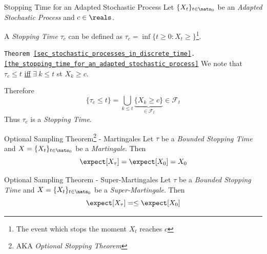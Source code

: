 \documentclass[11pt,a4paper]{article}
\begin{document}
    \begin{theorem}{Stopping Time for an Adapted Stochastic Process}\label{the_stopping_time_for_an_adapted_stochastic_process}
      Let $\{X_t\}_{t\in\nats_0}$ be an \textit{Adapted Stochastic Process} and $c\in\reals$.
      \par A \textit{Stopping Time} $\tau_c$ can be defined as $\tau_c=\inf\{t\geq0:X_t\geq \}$\footnote{The event which stops the moment $X_t$ reaches $c$}.
    \end{theorem}

    \begin{proposition}{\texttt{Theorem \ref{sec_stochastic_processes_in_discrete_time}.\ref{the_stopping_time_for_an_adapted_stochastic_process}}}
      We note that $\tau_c\leq t$ \underline{iff} $\exists\ k\leq t$ st $X_k\geq c$.
      \par Therefore
      \[ \{\tau_c\leq t\}=\bigcup\limits_{k\leq t}\underbrace{\{X_k\geq c\}}_{\in\mathcal{F}_t}\in\mathcal{F}_t \]
      Thus $\tau_c$ is a \textit{Stopping Time}.
    \end{proposition}

    \begin{theorem}{Optional Sampling Theorem\footnote{AKA \textit{Optional Stopping Theorem}} - Martingales}\label{the_optional_sampling_theorem}
      Let $\tau$ be a \textit{Bounded Stopping Time} and $X=\{X_t\}_{t\in\nats_0}$ be a \textit{Martingale}. Then
      \[ \expect[X_\tau]=\expect[X_0]=X_0 \]
    \end{theorem}

    \begin{theorem}{Optional Sampling Theorem - Super-Martingales}\label{the_optional_sampling_theorem_supermartingales}
      Let $\tau$ be a \textit{Bounded Stopping Time} and $X=\{X_t\}_{t\in\nats_0}$ be a \textit{Super-Martingale}. Then
      \[ \expect[X_\tau]=\leq \expect[X_0] \]
    \end{theorem}
\end{document}
